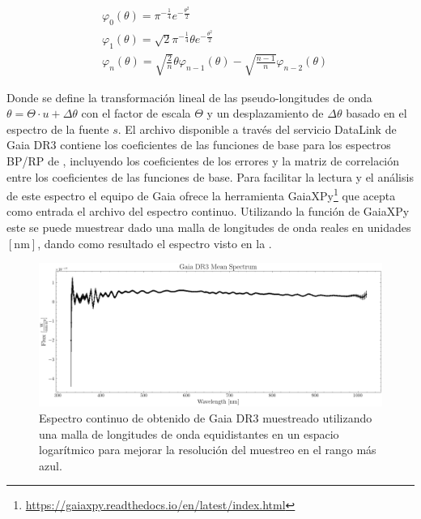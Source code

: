 \begin{eqfloat}
    \centering
    \begin{equation}
        \begin{split}
            & \varphi_0(\theta) = \pi^{-\frac{1}{4}} e^{-\frac{\theta^2}{2}} \\
            & \varphi_1(\theta) = \sqrt{2} \pi^{-\frac{1}{4}} \theta e^{-\frac{\theta^2}{2}} \\
            & \varphi_n(\theta) = \sqrt{\frac{2}{n}} \theta \varphi_{n-1}(\theta) - \sqrt{\frac{n - 1}{n}} \varphi_{n-2}(\theta)
        \end{split}
    \end{equation}
\end{eqfloat}

Donde se define la transformación lineal de las pseudo-longitudes de onda
$\theta = \Theta \cdot u + \Delta \theta$ con el factor de escala $\Theta$ y un
desplazamiento de $\Delta \theta$ basado en el espectro de la fuente $s$. El
archivo disponible a través del servicio DataLink de Gaia DR3 contiene los
coeficientes de las funciones de base para los espectros BP/RP de
\atoObjIdNoSpace, incluyendo los coeficientes de los errores y la matriz de
correlación entre los coeficientes de las funciones de base. Para facilitar la
lectura y el análisis de este espectro el equipo de Gaia ofrece la herramienta
GaiaXPy\footnote{\url{https://gaiaxpy.readthedocs.io/en/latest/index.html}} que
acepta como entrada el archivo del espectro continuo. Utilizando la función
 de GaiaXPy este se puede muestrear dado una malla de longitudes
de onda reales en unidades $[\mathrm{nm}]$, dando como resultado el espectro
visto en la .

\begin{figure}[!ht]
    \centering
    \includegraphics[scale=0.45]{Conclusion/Figures/Figura Gaia DR3 Espectro.png}
    \caption{Espectro continuo de \atoObjId obtenido de Gaia DR3 muestreado
    utilizando una malla de longitudes de onda equidistantes en un espacio
    logarítmico para mejorar la resolución del muestreo en el rango más azul.}
    \label{figuraEspectroGdr3}
\end{figure}

